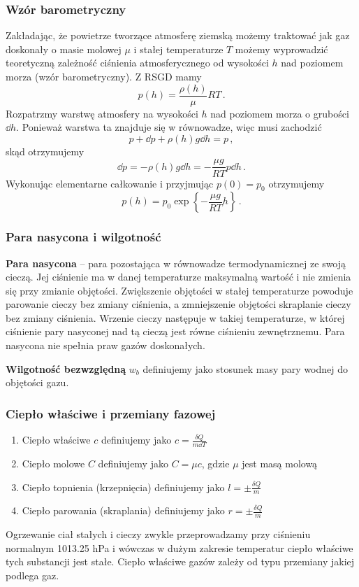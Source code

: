 \documentclass[../main.tex]{subfiles}
\begin{document}
\subsubsection{Wzór barometryczny}
Zakładając, że powietrze tworzące atmosferę ziemską możemy traktować jak gaz doskonały o masie
molowej \(\mu\) i stałej temperaturze \(T\) możemy wyprowadzić teoretyczną zależność ciśnienia
atmosferycznego od wysokości \(h\) nad poziomem morza (wzór barometryczny). Z RSGD mamy
\begin{equation*}
    p(h)=\frac{\rho(h)}{\mu}RT\,.
\end{equation*}
Rozpatrzmy warstwę atmosfery na wysokości \(h\) nad poziomem morza o grubości \(\dd{h}\). Ponieważ
warstwa ta znajduje się w równowadze, więc musi zachodzić
\begin{equation*}
    p+\dd{p}+\rho(h) g\dd{h}=p\,,
\end{equation*}
skąd otrzymujemy
\begin{equation*}
    \dd{p}=-\rho(h) g\dd{h}=-\frac{\mu g}{RT}p\dd{h}\,.
\end{equation*}
Wykonując elementarne całkowanie i przyjmując \(p(0)=p_0\) otrzymujemy
\begin{equation*}
    p(h)=p_0\exp\left\{-\frac{\mu g}{RT}h\right\}\,.
\end{equation*}
\subsubsection{Para nasycona i wilgotność}
\textbf{Para nasycona} -- para pozostająca w równowadze termodynamicznej ze swoją cieczą. Jej
ciśnienie ma w danej temperaturze maksymalną wartość i nie zmienia się przy zmianie objętości.
Zwiększenie objętości w stałej temperaturze powoduje parowanie cieczy bez zmiany ciśnienia, a
zmniejszenie objętości skraplanie cieczy bez zmiany ciśnienia. Wrzenie cieczy następuje w takiej
temperaturze, w której ciśnienie pary nasyconej nad tą cieczą jest równe ciśnieniu zewnętrznemu.
Para nasycona nie spełnia praw gazów doskonałych.
\medskip

\noindent\textbf{Wilgotność bezwzględną} \(w_b\) definiujemy jako stosunek masy pary wodnej do
objętości gazu.

\subsubsection{Ciepło właściwe i przemiany fazowej}
\begin{enumerate}
    \item Ciepło właściwe \(c\) definiujemy jako \(c=\frac{\delta Q}{m\dd{T}}\)
    \item Ciepło molowe \(C\) definiujemy jako \(C=\mu c\), gdzie \(\mu\) jest masą molową
    \item Ciepło topnienia (krzepnięcia) definiujemy jako \(l=\pm\frac{\delta Q}{m}\)
    \item Ciepło parowania (skraplania) definiujemy jako  \(r=\pm\frac{\delta Q}{m}\)
\end{enumerate}
Ogrzewanie ciał stałych i cieczy zwykle przeprowadzamy przy ciśnieniu normalnym 1013.25 hPa i
wówczas w dużym zakresie temperatur ciepło właściwe tych substancji jest stałe. Ciepło właściwe
gazów zależy od typu przemiany jakiej podlega gaz.
\end{document}
